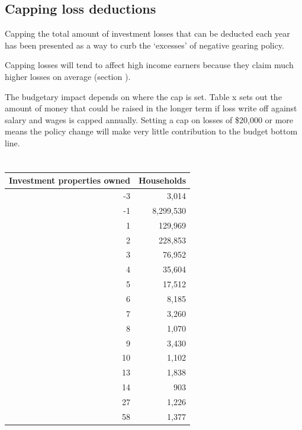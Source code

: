 \documentclass{grattan}\usepackage[]{graphicx}\usepackage[]{color}
\begin{document}
\subsection{Capping loss deductions}

Capping the total amount of investment losses that can be deducted each
year has been presented as a way to curb the `excesses' of negative
gearing policy.

Capping losses will tend to affect high income earners because they
claim much higher losses on average (section ).

The budgetary impact depends on where the cap is set. Table x sets out
the amount of money that could be raised in the longer term if loss
write off against salary and wages is capped annually. Setting a cap on
losses of \$20,000 or more means the policy change will make very little
contribution to the budget bottom line.






\section{}

\begin{table}[!h]
\begin{center}
\begin{tabular}{rr}
  \toprule
{\textbf{Investment properties owned}} & {\textbf{Households}} \\ 
  \midrule
 -3 & 3,014 \\ 
   -1 & 8,299,530 \\ 
    1 & 129,969 \\ 
    2 & 228,853 \\ 
    3 & 76,952 \\ 
    4 & 35,604 \\ 
    5 & 17,512 \\ 
    6 & 8,185 \\ 
    7 & 3,260 \\ 
    8 & 1,070 \\ 
    9 & 3,430 \\ 
   10 & 1,102 \\ 
   13 & 1,838 \\ 
   14 & 903 \\ 
   27 & 1,226 \\ 
   58 & 1,377 \\ 
   \bottomrule
\end{tabular}

\end{center}
\end{table}
\end{document}
